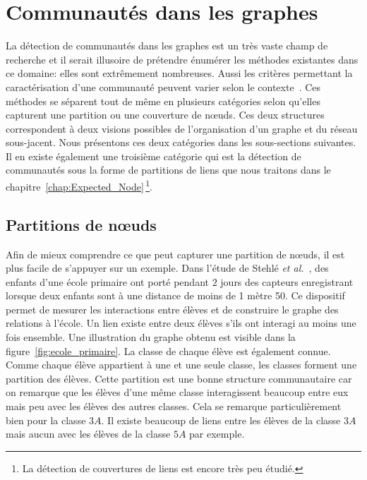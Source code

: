 \section{Communautés dans les graphes}
\label{sec:intro_communaute}

La détection de communautés dans les graphes est un très vaste champ de recherche et il serait illusoire de prétendre énumérer les méthodes existantes dans ce domaine: elles sont extrêmement nombreuses.
Aussi les critères permettant la caractérisation d'une communauté peuvent varier selon le contexte~\cite{Leskovec2008,Coscia2011,Yang2015,Jeub2015}.
Ces méthodes se séparent tout de même en plusieurs catégories selon qu'elles capturent une partition ou une couverture de n\oe{}uds.
Ces deux structures correspondent à deux visions possibles de l'organisation d'un graphe et du réseau sous-jacent.
Nous présentons ces deux catégories dans les sous-sections suivantes.
Il en existe également une troisième catégorie qui est la détection de communautés sous la forme de partitions de liens que nous traitons dans le chapitre~\ref{chap:Expected_Node}\,\footnote{La détection de couvertures de liens est encore très peu étudié.}.

\subsection{Partitions de n\oe{}uds}
\label{subsec:Part_noeuds}
Afin de mieux comprendre ce que peut capturer une partition de n\oe{}uds, il est plus facile de s'appuyer sur un exemple.
Dans l'étude de Stehlé \emph{et al.}~\cite{Stehle2011}, des enfants d'une école primaire ont porté pendant $2$ jours des capteurs enregistrant lorsque deux enfants sont à une distance de moins de 1 mètre 50.
Ce dispositif permet de mesurer les interactions entre élèves et de construire le graphe des relations à l'école.
Un lien existe entre deux élèves s'ils ont interagi au moins une fois ensemble.
Une illustration du graphe obtenu est visible dans la figure~\ref{fig:ecole_primaire}.
La classe de chaque élève est également connue.
Comme chaque élève appartient à une et une seule classe, les classes forment une partition des élèves.
Cette partition est une bonne structure communautaire car on remarque que les élèves d'une même classe interagissent beaucoup entre eux mais peu avec les élèves des autres classes.
Cela se remarque particulièrement bien pour la classe $3A$.
Il existe beaucoup de liens entre les élèves de la classe $3A$ mais aucun avec les élèves de la classe $5A$ par exemple.

